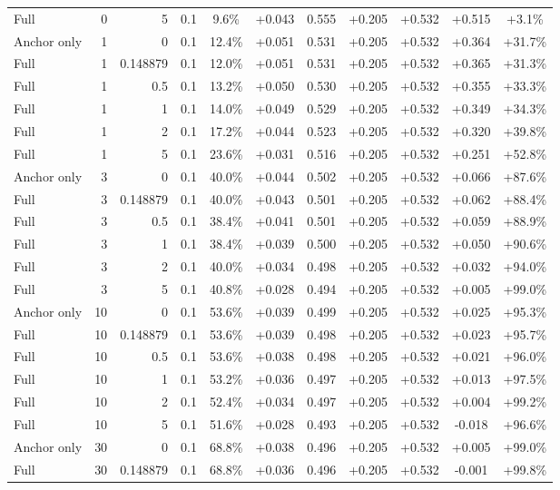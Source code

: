 \begin{table}[htbp]
\begin{tabular}{lrrrccccccc}
Full & 0 & 5 & 0.1 & 9.6\% & +0.043 & 0.555 & +0.205 & +0.532 & +0.515 & +3.1\% \\
Anchor only & 1 & 0 & 0.1 & 12.4\% & +0.051 & 0.531 & +0.205 & +0.532 & +0.364 & +31.7\% \\
Full & 1 & 0.148879 & 0.1 & 12.0\% & +0.051 & 0.531 & +0.205 & +0.532 & +0.365 & +31.3\% \\
Full & 1 & 0.5 & 0.1 & 13.2\% & +0.050 & 0.530 & +0.205 & +0.532 & +0.355 & +33.3\% \\
Full & 1 & 1 & 0.1 & 14.0\% & +0.049 & 0.529 & +0.205 & +0.532 & +0.349 & +34.3\% \\
Full & 1 & 2 & 0.1 & 17.2\% & +0.044 & 0.523 & +0.205 & +0.532 & +0.320 & +39.8\% \\
Full & 1 & 5 & 0.1 & 23.6\% & +0.031 & 0.516 & +0.205 & +0.532 & +0.251 & +52.8\% \\
Anchor only & 3 & 0 & 0.1 & 40.0\% & +0.044 & 0.502 & +0.205 & +0.532 & +0.066 & +87.6\% \\
Full & 3 & 0.148879 & 0.1 & 40.0\% & +0.043 & 0.501 & +0.205 & +0.532 & +0.062 & +88.4\% \\
Full & 3 & 0.5 & 0.1 & 38.4\% & +0.041 & 0.501 & +0.205 & +0.532 & +0.059 & +88.9\% \\
Full & 3 & 1 & 0.1 & 38.4\% & +0.039 & 0.500 & +0.205 & +0.532 & +0.050 & +90.6\% \\
Full & 3 & 2 & 0.1 & 40.0\% & +0.034 & 0.498 & +0.205 & +0.532 & +0.032 & +94.0\% \\
Full & 3 & 5 & 0.1 & 40.8\% & +0.028 & 0.494 & +0.205 & +0.532 & +0.005 & +99.0\% \\
Anchor only & 10 & 0 & 0.1 & 53.6\% & +0.039 & 0.499 & +0.205 & +0.532 & +0.025 & +95.3\% \\
Full & 10 & 0.148879 & 0.1 & 53.6\% & +0.039 & 0.498 & +0.205 & +0.532 & +0.023 & +95.7\% \\
Full & 10 & 0.5 & 0.1 & 53.6\% & +0.038 & 0.498 & +0.205 & +0.532 & +0.021 & +96.0\% \\
Full & 10 & 1 & 0.1 & 53.2\% & +0.036 & 0.497 & +0.205 & +0.532 & +0.013 & +97.5\% \\
Full & 10 & 2 & 0.1 & 52.4\% & +0.034 & 0.497 & +0.205 & +0.532 & +0.004 & +99.2\% \\
Full & 10 & 5 & 0.1 & 51.6\% & +0.028 & 0.493 & +0.205 & +0.532 & -0.018 & +96.6\% \\
Anchor only & 30 & 0 & 0.1 & 68.8\% & +0.038 & 0.496 & +0.205 & +0.532 & +0.005 & +99.0\% \\
Full & 30 & 0.148879 & 0.1 & 68.8\% & +0.036 & 0.496 & +0.205 & +0.532 & -0.001 & +99.8\% \\

\end{tabular}
\end{table}
